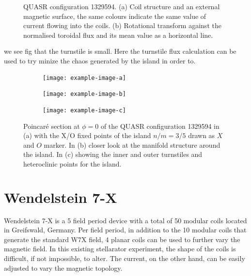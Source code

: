 \begin{figure}[H]
\begin{subfigure}[t]{0.49\textwidth}
        \caption{}
        \label{fig:iota-1329594}
    \end{subfigure}
    \caption{QUASR configuration 1329594. (a) Coil structure and an external magnetic surface, the same colours indicate the same value of current flowing into the coils. (b) Rotational transform against the normalised toroidal flux and its mean value as a horizontal line.}
    \label{fig:config-1329594}
\end{figure}

we see fig that the turnstile is small. Here the turnstile flux calculation can be used to try minize the chaos generated by the island in order to.

\begin{figure}[H]
    \centering
    \begin{subfigure}[t]{\textwidth}
        \centering
        \texttt{[image: example-image-a]}
        \caption{}
        \label{fig:p-1329594}
    \end{subfigure}
    \begin{subfigure}[t]{0.49\textwidth}
        \centering
        \texttt{[image: example-image-b]}
        \caption{}
        \label{fig:manifold-1329594}
    \end{subfigure}
    \hfill
    \begin{subfigure}[t]{0.49\textwidth}
        \centering
        \texttt{[image: example-image-c]}
        \caption{}
        \label{fig:turn-1329594}
    \end{subfigure}
    \caption{Poincaré section at $\phi=0$ of the QUASR configuration 1329594 in (a) with the X/O fixed points of the island $n/m = 3/5$ drawn as $X$ and $O$ marker. In (b) closer look at the manifold structure around the island. In (c) showing the inner and outer turnstiles and heteroclinic points for the island.}
    \label{fig:pmt-1329594}
\end{figure}


\section{Wendelstein 7-X}\label{sec:w7x}

Wendelstein 7-X is a 5 field period device with a total of 50 modular coils located in Greifswald, Germany. Per field period, in addition to the 10 modular coils that generate the standard W7X field, 4 planar coils can be used to further vary the magnetic field. In this existing stellarator experiment, the shape of the coils is difficult, if not impossible, to alter. The current, on the other hand, can be easily adjusted to vary the magnetic topology.

